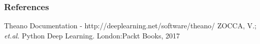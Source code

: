 \documentclass[aspectratio=169]{beamer}
\begin{document}
\begin{frame}
\frametitle{References}
\footnotesize{
\begin{thebibliography}{99}
 Theano  Documentation - http://deeplearning.net/software/theano/
 ZOCCA, V.; \textit{et.al.} Python Deep Learning. London:Packt Books, 2017


\end{thebibliography}
}
\end{frame}
\end{document}

